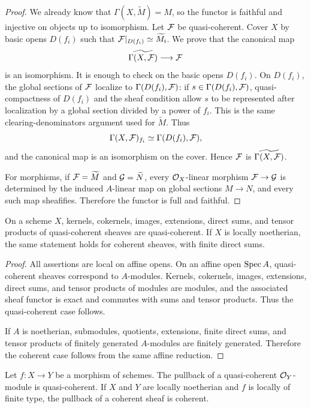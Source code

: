 \begin{proof}
We already know that \(\Gamma(X,\widetilde M)=M\), so the functor is faithful
and injective on objects up to isomorphism.  Let \(\mathcal{F}\) be quasi-coherent.
Cover \(X\) by basic opens \(D(f_i)\) such that
\(\mathcal{F}|_{D(f_i)}\simeq\widetilde{M_i}\).  We prove that the canonical map
\[
    \widetilde{\Gamma(X,\mathcal{F})}\longrightarrow \mathcal{F}
\]
is an isomorphism.  It is enough to check on the basic opens \(D(f_i)\).  On
\(D(f_i)\), the global sections of \(\mathcal{F}\) localize to
\(\Gamma(D(f_i),\mathcal{F})\): if \(s\in\Gamma(D(f_i),\mathcal{F})\), quasi-compactness of
\(D(f_i)\) and the sheaf condition allow \(s\) to be represented after
localization by a global section divided by a power of \(f_i\).  This is the
same clearing-denominators argument used for \(\widetilde M\).  Thus
\[
    \Gamma(X,\mathcal{F})_{f_i}\simeq\Gamma(D(f_i),\mathcal{F}),
\]
and the canonical map is an isomorphism on the cover.  Hence \(\mathcal{F}\) is
\(\widetilde{\Gamma(X,\mathcal{F})}\).

For morphisms, if \(\mathcal{F}=\widetilde M\) and \(\mathcal{G}=\widetilde N\), every
\(\mathcal{O}_X\)-linear morphism \(\mathcal{F}\to\mathcal{G}\) is determined by the induced
\(A\)-linear map on global sections \(M\to N\), and every such map sheafifies.
Therefore the functor is full and faithful.
\end{proof}

\begin{proposition}
On a scheme \(X\), kernels, cokernels, images, extensions, direct sums, and
tensor products of quasi-coherent sheaves are quasi-coherent.  If \(X\) is
locally noetherian, the same statement holds for coherent sheaves, with finite
direct sums.
\end{proposition}

\begin{proof}
All assertions are local on affine opens.  On an affine open \(\operatorname{Spec} A\),
quasi-coherent sheaves correspond to \(A\)-modules.  Kernels, cokernels,
images, extensions, direct sums, and tensor products of modules are modules,
and the associated sheaf functor is exact and commutes with sums and tensor
products.  Thus the quasi-coherent case follows.

If \(A\) is noetherian, submodules, quotients, extensions, finite direct sums,
and tensor products of finitely generated \(A\)-modules are finitely generated.
Therefore the coherent case follows from the same affine reduction.
\end{proof}

\begin{proposition}
Let \(f:X\to Y\) be a morphism of schemes.  The pullback of a quasi-coherent
\(\mathcal{O}_Y\)-module is quasi-coherent.  If \(X\) and \(Y\) are locally noetherian
and \(f\) is locally of finite type, the pullback of a coherent sheaf is
coherent.
\end{proposition}


